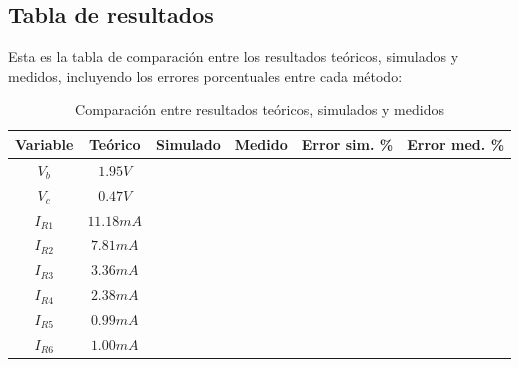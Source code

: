 \documentclass[conference]{IEEEtran}
\begin{document}
\subsection{Tabla de resultados}
Esta es la tabla de comparación entre los resultados teóricos, simulados y medidos, incluyendo los errores porcentuales entre cada método:
\begin{table}[h]
\centering
\caption{Comparación entre resultados teóricos, simulados y medidos}
\begin{tabular}{|c|c|c|c|c|c|}
\hline
\textbf{Variable} & \textbf{Teórico} & \textbf{Simulado} & \textbf{Medido} & \textbf{Error sim. \%} & \textbf{Error med. \%} \\
\hline
$V_b$ & $1.95V$ & & & & \\
\hline
$V_c$ & $0.47V$ & & & & \\
\hline
$I_{R1}$ & $11.18mA$ & & & & \\
\hline
$I_{R2}$ & $7.81mA$ & & & & \\
\hline
$I_{R3}$ & $3.36mA$ & & & & \\
\hline
$I_{R4}$ & $2.38mA$ & & & & \\
\hline
$I_{R5}$ & $0.99mA$ & & & & \\
\hline
$I_{R6}$ & $1.00mA$ & & & & \\
\hline
\end{tabular}
\end{table}
\end{document}
